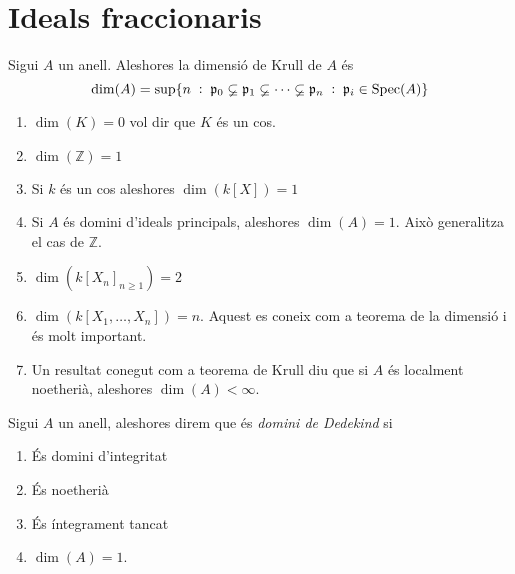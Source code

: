 \documentclass[../../../main.tex]{subfiles}
\begin{document}
\section{Ideals fraccionaris}


\begin{defi}
\label{def:dimensioDeKrull} Sigui $A$ un anell. Aleshores la dimensió de Krull de $A$ és
\begin{equation}
    \notag
    \dim(A) = \sup\{n\;:\;\mathfrak{p}_0\varsubsetneq \mathfrak{p}_1\varsubsetneq\cdots\varsubsetneq\mathfrak{p}_n\;:\;\mathfrak{p}_i\in\mathrm{Spec}(A)\}
\end{equation}
\end{defi}

\begin{ej}
\begin{enumerate}[(1)]
    \item $\dim(K) = 0$ vol dir que $K$ és un cos.
    \item $\dim(\mathbb{Z}) = 1$
    \item Si $k$ és un cos aleshores $\dim(k[X]) = 1$
    \item Si $A$ és domini d'ideals principals, aleshores $\dim(A) = 1$. Això generalitza el cas de $\mathbb{Z}$.
    \item $\dim(k[X_n]_{n\geq 1}) = 2$
    \item $\dim(k[X_1,\ldots,X_n]) = n$. Aquest es coneix com a teorema de la dimensió i és molt important.
    \item Un resultat conegut com a teorema de Krull diu que si $A$ és localment noetherià, aleshores $\dim(A) <\infty$.
\end{enumerate}
\end{ej}


\begin{defi}
\label{def:dominiDeDededkind} Sigui $A$ un anell, aleshores direm que és \textit{domini de Dedekind} si
\begin{enumerate}[(1)]
    \item És domini d'integritat
    \item És noetherià
    \item És íntegrament tancat
    \item $\dim(A) = 1$.
\end{enumerate}
\end{defi}
\end{document}
